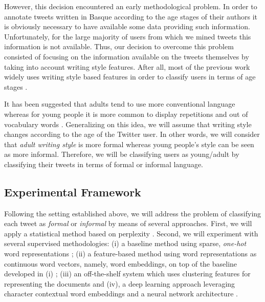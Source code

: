\documentclass[information,article,submit,moreauthors,pdftex,10pt,a4paper]{Definitions/mdpi}
\begin{document}
However, this decision encountered an early methodological problem. In order to annotate tweets written in Basque according to the age stages of their authors it is obviously necessary to have available some data providing such information. Unfortunately, for the large majority of users from which we mined tweets this information is not available. Thus, our decision to overcome this problem consisted of focusing on the information available on the tweets themselves by taking into account writing style features. After all, most of the previous work widely uses writing style based features in order to classify users in terms of age stages \citep{rao2010classifying,al2012homophily,nguyen2013old,morgan2017predicting}.

It has been suggested that adults tend to use more conventional language \cite{nguyen2013old} whereas for young people it is more common to display repetitions and out of vocabulary words \citep{rao2010classifying,rosenthal2011age,morgan2017predicting}. Generalizing on this idea, we will assume that writing style changes according to the age of the Twitter user. In other words, we will consider that \emph{adult writing style} is more formal whereas young people's style can be seen as more informal. Therefore, we will be classifying users as young/adult by classifying their tweets in terms of formal or informal language.

\subsection{Experimental Framework}\label{sec:exper-fram}

Following the setting established above, we will address the problem of classifying each tweet as \emph{formal} or \emph{informal} by means of several approaches. First, we will apply a statistical method based on perplexity \cite{gamallo2017language}. Second, we will experiment with several supervised methodologies: (i) a baseline method using sparse, \emph{one-hot} word representations \cite{pedregosa2011scikit}; (ii) a feature-based method using word representations as continuous word vectors, namely, word embeddings, on top of the baseline developed in (i) \cite{mikolov2013distributed,pennington-etal-2014-glove,mikolov-etal-2018-advances}; (iii) an off-the-shelf system which uses clustering features for representing the documents \cite{agerri2016robust,agerri2019language} and (iv), a deep learning approach leveraging character contextual word embeddings and a neural network architecture \cite{akbik2018contextual}.
\end{document}
